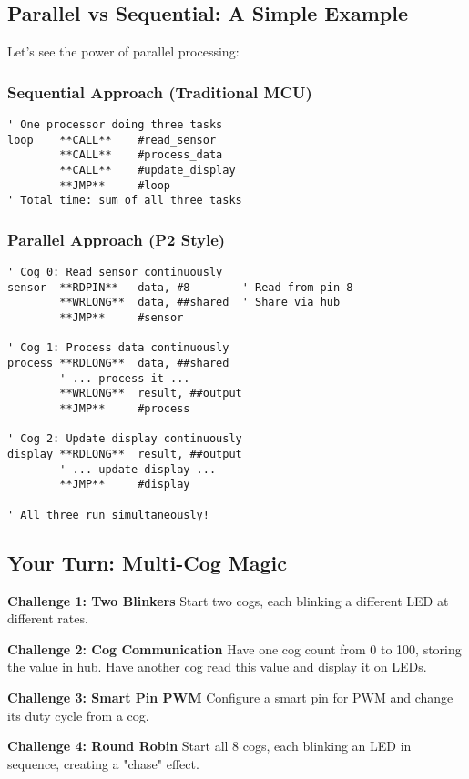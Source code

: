 \documentclass[11pt]{book}
\begin{document}
\hypertarget{parallel-vs-sequential-a-simple-example}{%
\subsection{Parallel vs Sequential: A Simple
Example}\label{parallel-vs-sequential-a-simple-example}}

Let's see the power of parallel processing:

\hypertarget{sequential-approach-traditional-mcu}{%
\subsubsection{Sequential Approach (Traditional
MCU)}\label{sequential-approach-traditional-mcu}}

\begin{lstlisting}
' One processor doing three tasks
loop    **CALL**    #read_sensor
        **CALL**    #process_data  
        **CALL**    #update_display
        **JMP**     #loop
' Total time: sum of all three tasks
\end{lstlisting}

\hypertarget{parallel-approach-p2-style}{%
\subsubsection{Parallel Approach (P2
Style)}\label{parallel-approach-p2-style}}

\begin{lstlisting}
' Cog 0: Read sensor continuously
sensor  **RDPIN**   data, #8        ' Read from pin 8
        **WRLONG**  data, ##shared  ' Share via hub
        **JMP**     #sensor

' Cog 1: Process data continuously  
process **RDLONG**  data, ##shared
        ' ... process it ...
        **WRLONG**  result, ##output
        **JMP**     #process
        
' Cog 2: Update display continuously
display **RDLONG**  result, ##output
        ' ... update display ...
        **JMP**     #display
        
' All three run simultaneously!
\end{lstlisting}

\hypertarget{your-turn-multi-cog-magic}{%
\subsection{Your Turn: Multi-Cog
Magic}\label{your-turn-multi-cog-magic}}

\begin{yourturn}
\textbf{Challenge 1: Two Blinkers}
Start two cogs, each blinking a different LED at different rates.

\textbf{Challenge 2: Cog Communication}
Have one cog count from 0 to 100, storing the value in hub. Have another cog read this value and display it on LEDs.

\textbf{Challenge 3: Smart Pin PWM}
Configure a smart pin for PWM and change its duty cycle from a cog.

\textbf{Challenge 4: Round Robin}
Start all 8 cogs, each blinking an LED in sequence, creating a "chase" effect.
\end{yourturn}
\end{document}
